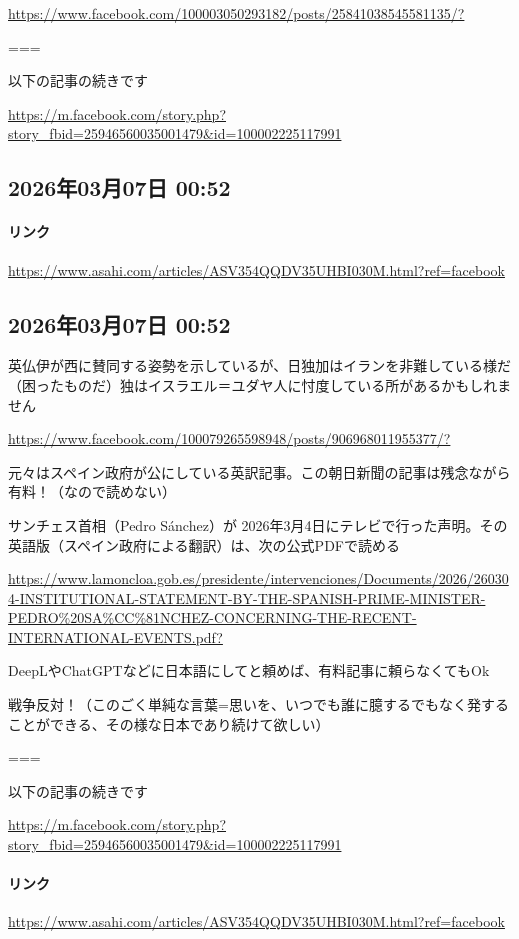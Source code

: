 \url{https://www.facebook.com/100003050293182/posts/25841038545581135/?}

===

以下の記事の続きです

\url{https://m.facebook.com/story.php?story_fbid=25946560035001479&id=100002225117991}

\subsection*{2026年03月07日 00:52}

\paragraph{リンク}
\url{https://www.asahi.com/articles/ASV354QQDV35UHBI030M.html?ref=facebook}

\subsection*{2026年03月07日 00:52}

英仏伊が西に賛同する姿勢を示しているが、日独加はイランを非難している様だ（困ったものだ）独はイスラエル＝ユダヤ人に忖度している所があるかもしれません

\url{https://www.facebook.com/100079265598948/posts/906968011955377/?}

元々はスペイン政府が公にしている英訳記事。この朝日新聞の記事は残念ながら有料！（なので読めない）

サンチェス首相（Pedro Sánchez）が 2026年3月4日にテレビで行った声明。その英語版（スペイン政府による翻訳）は、次の公式PDFで読める

\url{https://www.lamoncloa.gob.es/presidente/intervenciones/Documents/2026/260304-INSTITUTIONAL-STATEMENT-BY-THE-SPANISH-PRIME-MINISTER-PEDRO\%20SA\%CC\%81NCHEZ-CONCERNING-THE-RECENT-INTERNATIONAL-EVENTS.pdf?}

DeepLやChatGPTなどに日本語にしてと頼めば、有料記事に頼らなくてもOk

戦争反対！（このごく単純な言葉=思いを、いつでも誰に臆するでもなく発することができる、その様な日本であり続けて欲しい）

===

以下の記事の続きです

\url{https://m.facebook.com/story.php?story_fbid=25946560035001479&id=100002225117991}

\paragraph{リンク}
\url{https://www.asahi.com/articles/ASV354QQDV35UHBI030M.html?ref=facebook}

